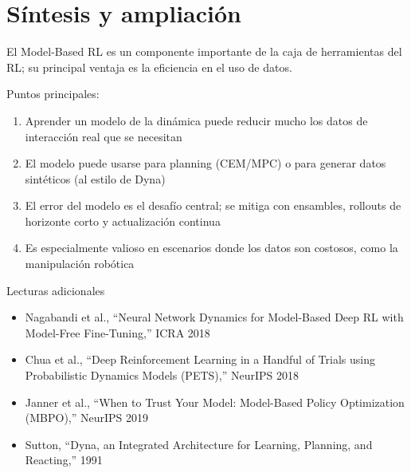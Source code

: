 \section{Síntesis y ampliación}

El Model-Based RL es un componente importante de la caja de herramientas del RL; su principal ventaja es la eficiencia en el uso de datos.

Puntos principales:
\begin{enumerate}
    \item Aprender un modelo de la dinámica puede reducir mucho los datos de interacción real que se necesitan
    \item El modelo puede usarse para planning (CEM/MPC) o para generar datos sintéticos (al estilo de Dyna)
    \item El error del modelo es el desafío central; se mitiga con ensambles, rollouts de horizonte corto y actualización continua
    \item Es especialmente valioso en escenarios donde los datos son costosos, como la manipulación robótica
\end{enumerate}

\begin{knowledgebox}{Lecturas adicionales}
\begin{itemize}
    \item Nagabandi et al., ``Neural Network Dynamics for Model-Based Deep RL with Model-Free Fine-Tuning,'' ICRA 2018
    \item Chua et al., ``Deep Reinforcement Learning in a Handful of Trials using Probabilistic Dynamics Models (PETS),'' NeurIPS 2018
    \item Janner et al., ``When to Trust Your Model: Model-Based Policy Optimization (MBPO),'' NeurIPS 2019
    \item Sutton, ``Dyna, an Integrated Architecture for Learning, Planning, and Reacting,'' 1991
\end{itemize}
\end{knowledgebox}



